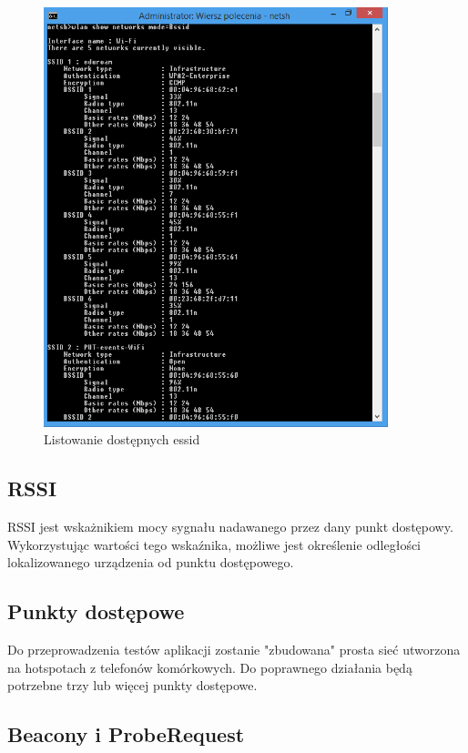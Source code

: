 \documentclass{article}
\begin{document}
\begin{figure}[H]
	\centering
	\includegraphics[width=10cm]{przykladbssid.png}
	\caption{Listowanie dostępnych essid}
	\label{fig:obrazek przykladbssid.png}
\end{figure}



\subsection{RSSI}

RSSI jest wskażnikiem mocy sygnału nadawanego przez dany punkt dostępowy. Wykorzystując wartości tego wskaźnika, możliwe jest określenie odległości lokalizowanego urządzenia od punktu dostępowego.



\subsection{Punkty dostępowe}

Do przeprowadzenia testów aplikacji zostanie "zbudowana" prosta sieć utworzona na hotspotach z telefonów komórkowych. Do poprawnego działania będą potrzebne trzy lub więcej punkty dostępowe.

\subsection{Beacony i ProbeRequest}
\end{document}
